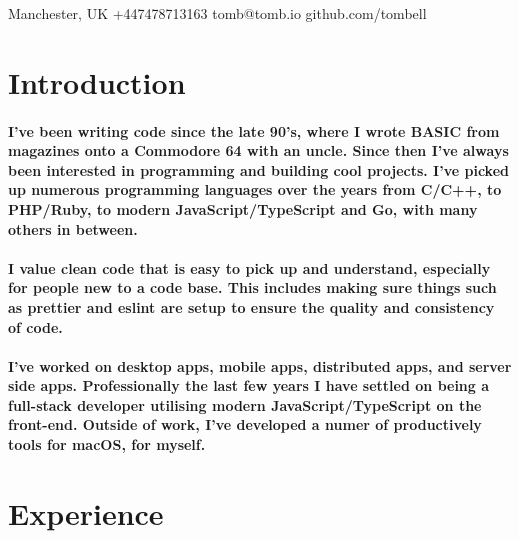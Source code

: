\documentclass[a4paper]{article}
\author{Tom Bell}
\renewcommand{\maketitle}{
  \begin{center}
    \huge{\textbf\theauthor}
  \end{center}
}
\begin{document}
\maketitle

\begin{center}
  \raisebox{0\height}{\small\faMapMarker} Manchester, UK
  \hspace{1cm}
  \raisebox{-0.1\height}{\small\faMobile} +447478713163
  \hspace{1cm}
  \raisebox{-0.1\height}{\small\faEnvelope} tomb@tomb.io
  \hspace{1cm}
  \raisebox{-0.1\height}{\small\faGithubAlt} github.com/tombell
\end{center}

\section{Introduction}
\paragraph{I've been writing code since the late 90's, where I wrote BASIC from
magazines onto a Commodore 64 with an uncle. Since then I've always been
interested in programming and building cool projects. I've picked up numerous
programming languages over the years from C/C++, to PHP/Ruby, to modern
JavaScript/TypeScript and Go, with many others in between.}

\paragraph{I value clean code that is easy to pick up and understand, especially
for people new to a code base. This includes making sure things such as prettier
and eslint are setup to ensure the quality and consistency of code.}

\paragraph{I've worked on desktop apps, mobile apps, distributed apps, and
server side apps. Professionally the last few years I have settled on being a
full-stack developer utilising modern JavaScript/TypeScript on the front-end.
Outside of work, I've developed a numer of productively tools for macOS, for
myself.}

\section{Experience}
\end{document}
